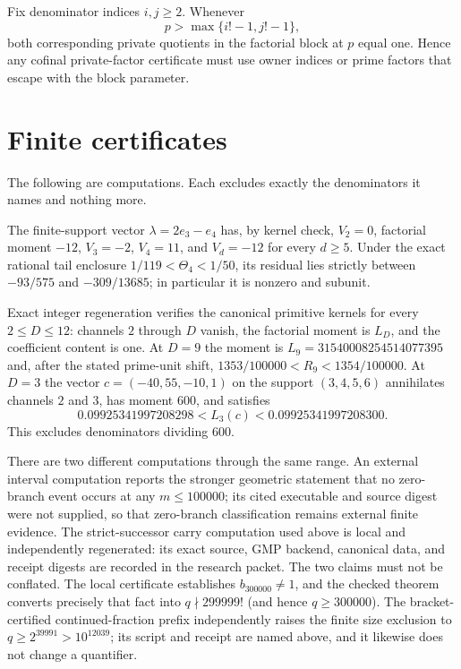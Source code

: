 \documentclass[11pt]{article}
\newcommand{\Lc}{L}
\begin{document}
\begin{proposition}
\label{bdry:fixed-owner-absorption}
Fix denominator indices $i,j\geq2$.  Whenever
\[
 p>\max\{i!-1,j!-1\},
\]
both corresponding private quotients in the factorial block at $p$ equal
one.  Hence any cofinal private-factor certificate must use owner indices or
prime factors that escape with the block parameter.
\end{proposition}

\section{Finite certificates}\label{sec:finite}

The following are computations.  Each excludes exactly the denominators it
names and nothing more.

The finite-support vector $\lambda=2e_3-e_4$ has, by kernel check, $V_2=0$,
factorial moment $-12$, $V_3=-2$, $V_4=11$, and $V_d=-12$ for every $d\ge5$.
Under the exact rational tail enclosure $1/119<\Theta_4<1/50$, its residual lies
strictly between $-93/575$ and $-309/13685$; in particular it is nonzero and
subunit.

Exact integer regeneration verifies the canonical primitive kernels for every
$2\le D\le12$: channels $2$ through $D$ vanish, the factorial moment is
$\Lc_D$, and the coefficient content is one.  At $D=9$ the moment is
$\Lc_9=31540008254514077395$ and, after the stated prime-unit shift,
$1353/100000<R_9<1354/100000$.  At $D=3$ the vector $c=(-40,55,-10,1)$ on the
support $(3,4,5,6)$ annihilates channels $2$ and $3$, has moment $600$, and
satisfies
\[
  0.09925341997208298<\Lc_3(c)<0.09925341997208300 .
\]
This excludes denominators dividing $600$.

There are two different computations through the same range.  An external
interval computation reports the stronger geometric statement that no
zero-branch event occurs at any $m\le100000$; its cited executable and source
digest were not supplied, so that zero-branch classification remains external
finite evidence.  The strict-successor carry computation used above is local
and independently regenerated: its exact source, GMP backend, canonical
data, and receipt digests are recorded in the research packet.  The two
claims must not be conflated.  The local certificate establishes
$b_{300000}\ne1$, and the checked theorem converts precisely that fact into
$q\nmid299999!$ (and hence $q\ge300000$).  The bracket-certified continued-fraction prefix independently
raises the finite size exclusion to $q\ge2^{39991}>10^{12039}$; its script and
receipt are named above, and it likewise does not change a quantifier.
\end{document}
